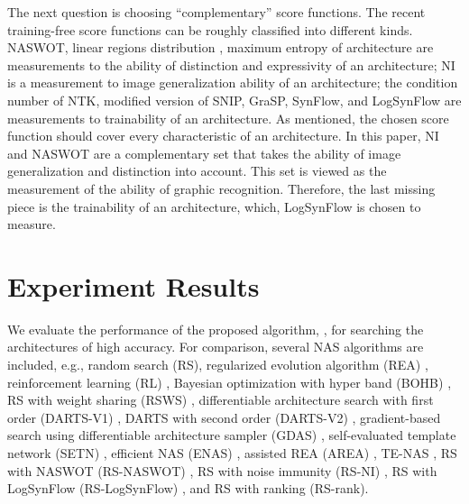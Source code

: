 \documentclass[sigconf]{acmart}
\begin{document}
    The next question is choosing ``complementary'' score functions. The recent training-free 
    score functions can be roughly classified into different kinds. NASWOT, 
    linear regions distribution \cite{https://doi.org/10.48550/arxiv.2102.11535} \cite{lin2021zennas}, 
    maximum entropy of architecture \cite{sun2022maedet} are measurements 
    to the ability of distinction and expressivity of an architecture; 
    NI is a measurement to image generalization ability of an architecture; 
    the condition number of NTK, modified version of SNIP, GraSP, SynFlow, and 
    LogSynFlow are measurements to trainability of an architecture. 
    As mentioned, the chosen score function should cover every characteristic 
    of an architecture. In this paper, NI and NASWOT are a complementary set 
    that takes the ability of image generalization and distinction into account. 
    This set is viewed as the measurement of the ability of graphic 
    recognition. Therefore, the last missing piece is the trainability of an 
    architecture, which, LogSynFlow is chosen to measure. 

    \section{Experiment Results}
    \label{sec:results}

    We evaluate the performance of the proposed algorithm, \palg{}, 
    for searching the architectures of high accuracy. For comparison, several NAS 
    algorithms are included, e.g., random search (RS), regularized evolution algorithm 
    (REA) \cite{real2019regularized}, reinforcement learning (RL) \cite{Williams:92}, 
    Bayesian optimization with hyper band (BOHB) \cite{falkner2018bohb}, RS with 
    weight sharing (RSWS) \cite{li2019random}, differentiable architecture search 
    with first order (DARTS-V1) \cite{liu2019darts}, DARTS with second order 
    (DARTS-V2) \cite{liu2019darts}, gradient-based search using differentiable 
    architecture sampler (GDAS) \cite{dong2019searching}, self-evaluated template 
    network (SETN) \cite{Dong_2019}, efficient NAS (ENAS) \cite{pham2018efficient}, 
    assisted REA (AREA) \cite{https://doi.org/10.48550/arxiv.2006.04647}, 
    TE-NAS \cite{https://doi.org/10.48550/arxiv.2102.11535}, RS with NASWOT (RS-NASWOT) \cite{https://doi.org/10.48550/arxiv.2006.04647}, 
    RS with noise immunity (RS-NI) \cite{10092788}, RS with LogSynFlow (RS-LogSynFlow) \cite{Cavagnero_2023}, 
    and RS with ranking (RS-rank). 
\end{document}

